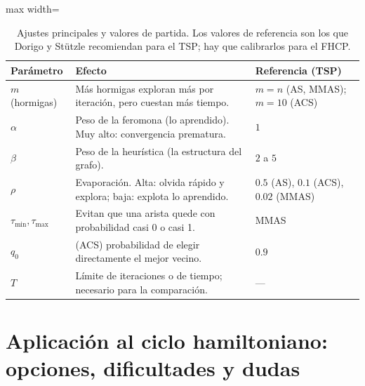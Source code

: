 \begin{table}[H]
\centering
\caption{Ajustes principales y valores de partida. Los valores de referencia son los que
Dorigo y Stützle \cite{aco3} recomiendan para el TSP; hay que calibrarlos para el FHCP.}
\label{aco:tab:params}
\begin{adjustbox}{max width=\linewidth}
\begin{tabular}{@{}p{2.7cm}p{6.9cm}p{4.4cm}@{}}
\toprule
Parámetro & Efecto & Referencia (TSP) \\
\midrule
$m$ (hormigas) & Más hormigas exploran más por iteración, pero cuestan más tiempo.
               & $m=n$ (AS, MMAS); $m=10$ (ACS) \\
$\alpha$ & Peso de la feromona (lo aprendido). Muy alto: convergencia prematura. & $1$ \\
$\beta$  & Peso de la heurística (la estructura del grafo). & $2$ a $5$ \\
$\rho$   & Evaporación. Alta: olvida rápido y explora; baja: explota lo aprendido.
         & $0.5$ (AS), $0.1$ (ACS), $0.02$ (MMAS) \\
$\tau_{\min},\tau_{\max}$ & Evitan que una arista quede con probabilidad casi 0 o casi 1. & MMAS \\
$q_0$    & (ACS) probabilidad de elegir directamente el mejor vecino. & $0.9$ \\
$T$      & Límite de iteraciones o de tiempo; necesario para la comparación. & ---\\
\bottomrule
\end{tabular}
\end{adjustbox}
\end{table}

\section{Aplicación al ciclo hamiltoniano: opciones, dificultades y dudas}

